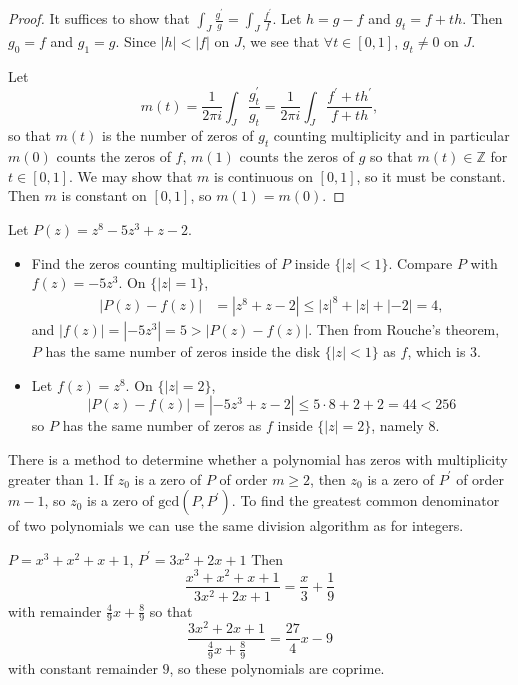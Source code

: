 \begin{proof}
It suffices to show that
$\int_J \frac{g^\prime}{g} = \int_J \frac{f^\prime}{f}$.
Let $h = g - f$ and $g_t = f + th$. Then
$g_0 = f$ and $g_1 = g$. Since $|h| < |f|$ on $J$,
we see that $\forall t \in [0, 1]$, $g_t \neq 0$
on $J$.

Let
$$
  m(t)
= \frac{1}{2 \pi i}
  \int_J
    \frac{g_t^\prime}{g_t}
= \frac{1}{2 \pi i}
  \int_J
    \frac{f^\prime + t h^\prime}
         {f + t h},
$$
so that $m(t)$ is the number of zeros
of $g_t$ counting multiplicity and in particular
$m(0)$ counts the zeros of $f$, $m(1)$ counts the
zeros of $g$ so that $m(t) \in \mathbb{Z}$ for
$t \in [0, 1]$. We may show that $m$ is
continuous on $[0, 1]$, so it must be constant.
Then $m$ is constant on $[0, 1]$, so
$m(1) = m(0)$.
\end{proof}

\begin{xmpl}
Let $P(z) = z^8 - 5z^3 + z - 2$.
\begin{itemize}
  \item{
    Find the zeros
    counting multiplicities of $P$ inside $\{|z| < 1\}$.
    Compare $P$ with $f(z) = -5z^3$. On $\{|z| = 1\}$,
    \begin{align*}
       |P(z) - f(z)|
    &= |z^8 + z - 2|
    \leq |z|^8 + |z| + |-2| = 4,
    \end{align*}
    and $|f(z)| = |-5z^3| = 5 > |P(z) - f(z)|$. Then
    from Rouche's theorem, $P$ has the same number of
    zeros inside the disk $\{ |z| < 1 \}$ as $f$, which
    is 3.
  }
  \item{
    Let $f(z) = z^8$. On $\{|z| = 2\}$,
    $$
      |P(z) - f(z)|
    = |-5z^3 + z - 2|
    \leq 5 \cdot 8 + 2 + 2 = 44 < 256
    $$
    so $P$ has the same number of zeros as $f$ inside
    $\{ |z| = 2 \}$, namely 8.
  }
\end{itemize}
\end{xmpl}

There is a method to determine whether a polynomial has
zeros with multiplicity greater than 1. If $z_0$ is a zero
of $P$ of order $m \geq 2$, then $z_0$ is a zero of $P^\prime$
of order $m - 1$, so $z_0$ is a zero of $\mathrm{gcd}(P, P^\prime)$.
To find the greatest common denominator of two polynomials
we can use the same division algorithm as for integers.

$P = x^3 + x^2 + x + 1$, $P^\prime = 3x^2 + 2x + 1$
Then
$$
  \frac{x^3 + x^2 + x + 1}{3x^2 + 2x + 1}
= \frac{x}{3} + \frac{1}{9}
$$
with remainder $\frac{4}{9} x + \frac{8}{9}$ so that
$$
  \frac{3x^2 + 2x + 1}{\frac{4}{9} x + \frac{8}{9}}
= \frac{27}{4} x - 9
$$
with constant remainder $9$, so these polynomials are
coprime.


